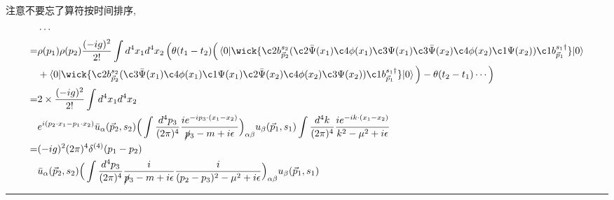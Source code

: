 \begin{itemize}
	\begin{tcolorbox}[title=calculation:]
		注意不要忘了算符按时间排序,
		\begin{align}
			& \cdots \notag \\
			=& \rho(p_1) \rho(p_2) \frac{(- i g)^2}{2!} \int d^4 x_1 d^4 x_2 \, \Big( \theta(t_1 - t_2) \Big( \braket{0 | \wick{
				\c2 b^{s_2}_{\vec{p}_2} (\c2 {\bar{\Psi}}(x_1) \c4 \phi(x_1) \c3 \Psi(x_1) \c3 {\bar{\Psi}}(x_2) \c4 \phi(x_2) \c1 \Psi(x_2)) \c1 b^{s_1 \dag}_{\vec{p}_1}
			} | 0} \notag \\
			& + \braket{0 | \wick{
				\c2 b^{s_2}_{\vec{p}_2} (\c3 {\bar{\Psi}}(x_1) \c4 \phi(x_1) \c1 \Psi(x_1) \c2 {\bar{\Psi}}(x_2) \c4 \phi(x_2) \c3 \Psi(x_2)) \c1 b^{s_1 \dag}_{\vec{p}_1}
			} | 0} \Big) - \theta(t_2 - t_1) \cdots \Big) \notag \\
			=& 2 \times \frac{(- i g)^2}{2!} \int d^4 x_1 d^4 x_2 \notag \\
			& e^{i (p_2 \cdot x_1 - p_1 \cdot x_2)} \bar{u}_\alpha(\vec{p}_2, s_2) \Big( \int \frac{d^4 p_3}{(2 \pi)^4} \frac{i e^{- i p_3 \cdot (x_1 - x_2)}}{\cancel{p}_3 - m + i \epsilon} \Big)_{\alpha \beta} u_\beta(\vec{p}_1, s_1) \int \frac{d^4 k}{(2 \pi)^4} \frac{i e^{- i k \cdot (x_1 - x_2)}}{k^2 - \mu^2 + i \epsilon} \notag \\
			=& (- i g)^2 (2 \pi)^4 \delta^{(4)}(p_1 - p_2) \notag \\
			& \bar{u}_\alpha(\vec{p}_2, s_2) \Big( \int \frac{d^4 p_3}{(2 \pi)^4} \frac{i}{\cancel{p}_3 - m + i \epsilon} \frac{i}{(p_2 - p_3)^2 - \mu^2 + i \epsilon} \Big)_{\alpha \beta} u_\beta(\vec{p}_1, s_1)
		\end{align}
	\end{tcolorbox}
	
	\noindent\rule[0.5ex]{\linewidth}{0.5pt} %
	

\end{itemize}
